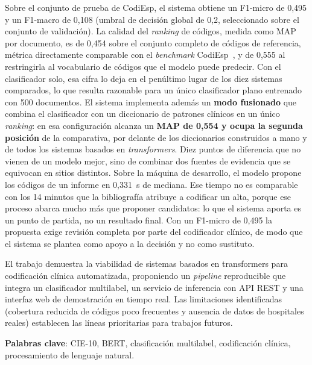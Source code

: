 Sobre el conjunto de prueba de CodiEsp, el sistema obtiene un F1-micro de 0,495 y un F1-macro de 0,108 (umbral de decisión global de 0,2, seleccionado sobre el conjunto de validación). La calidad del \emph{ranking} de códigos, medida como MAP por documento, es de 0,454 sobre el conjunto completo de códigos de referencia, métrica directamente comparable con el \emph{benchmark} CodiEsp~\cite{miranda2020}, y de 0,555 al restringirla al vocabulario de códigos que el modelo puede predecir. Con el clasificador solo, esa cifra lo deja en el penúltimo lugar de los diez sistemas comparados, lo que resulta razonable para un único clasificador plano entrenado con 500 documentos. El sistema implementa además un \textbf{modo fusionado} que combina el clasificador con un diccionario de patrones clínicos en un único \emph{ranking}: en esa configuración alcanza un \textbf{MAP de 0,554 y ocupa la segunda posición} de la comparativa, por delante de los diccionarios construidos a mano y de todos los sistemas basados en \emph{transformers}. Diez puntos de diferencia que no vienen de un modelo mejor, sino de combinar dos fuentes de evidencia que se equivocan en sitios distintos. Sobre la máquina de desarrollo, el modelo propone los códigos de un informe en 0,331~s de mediana. Ese tiempo no es comparable con los 14 minutos que la bibliografía atribuye a codificar un alta, porque ese proceso abarca mucho más que proponer candidatos: lo que el sistema aporta es un punto de partida, no un resultado final. Con un F1-micro de 0,495 la propuesta exige revisión completa por parte del codificador clínico, de modo que el sistema se plantea como apoyo a la decisión y no como sustituto.

El trabajo demuestra la viabilidad de sistemas basados en transformers para codificación clínica automatizada, proponiendo un \emph{pipeline} reproducible que integra un clasificador multilabel, un servicio de inferencia con API REST y una interfaz web de demostración en tiempo real. Las limitaciones identificadas (cobertura reducida de códigos poco frecuentes y ausencia de datos de hospitales reales) establecen las líneas prioritarias para trabajos futuros.

\bigskip
\noindent\textbf{Palabras clave}: CIE-10, BERT, clasificación multilabel, codificación clínica, procesamiento de lenguaje natural.

\cleardoublepage %






